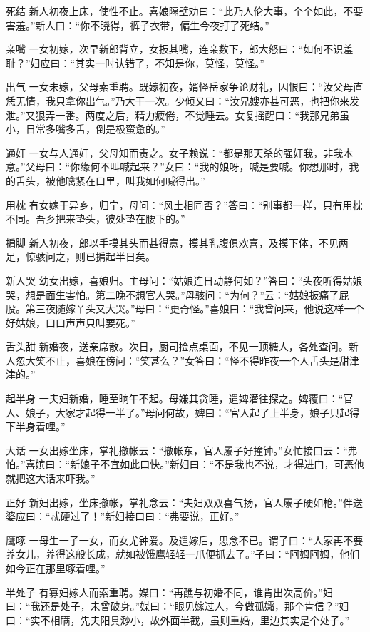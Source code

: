 \documentclass[12pt,UTF8]{ctexbook}
\begin{document}
死结
新人初夜上床，使性不止。喜娘隔壁劝曰：“此乃人伦大事，个个如此，不要害羞。”新人曰：“你不晓得，裤子衣带，偏生今夜打了死结。”

亲嘴
一女初嫁，次早新郎背立，女扳其嘴，连亲数下，郎大怒曰：“如何不识羞耻？”妇应曰：“其实一时认错了，不知是你，莫怪，莫怪。”

出气
一女未嫁，父母索重聘。既嫁初夜，婿怪岳家争论财礼，因恨曰：“汝父母直恁无情，我只拿你出气。”乃大干一次。少倾又曰：“汝兄嫂亦甚可恶，也把你来发泄。”又狠弄一番。两度之后，精力疲倦，不觉睡去。女复摇醒曰：“我那兄弟虽小，日常多嘴多舌，倒是极蛮惫的。”

通奸
一女与人通奸，父母知而责之。女子赖说：“都是那天杀的强奸我，非我本意。”父母曰：“你缘何不叫喊起来？”女曰：“我的娘呀，喊是要喊。你想那时，我的舌头，被他噙紧在口里，叫我如何喊得出。”

用枕
有女嫁于异乡，归宁，母问：“风土相同否？”答曰：“别事都一样，只有用枕不同。吾乡把来垫头，彼处垫在腰下的。”

掮脚
新人初夜，郎以手摸其头而甚得意，摸其乳腹俱欢喜，及摸下体，不见两足，惊骇问之，则已掮起半日矣。

新人哭
幼女出嫁，喜娘归。主母问：“姑娘连日动静何如？”答曰：“头夜听得姑娘哭，想是面生害怕。第二晚不想官人哭。”母骇问：“为何？”云：“姑娘扳痛了屁股。第三夜随嫁丫头又大哭。”母曰：“更奇怪。”喜娘曰：“我曾问来，他说这样一个好姑娘，口口声声只叫要死。”

舌头甜
新婚夜，送亲席散。次日，厨司捡点桌面，不见一顶糖人，各处查问。新人忽大笑不止，喜娘在傍问：“笑甚么？”女答曰：“怪不得昨夜一个人舌头是甜津津的。”

起半身
一夫妇新婚，睡至晌午不起。母嫌其贪睡，遣婢潜往探之。婢覆曰：“官人、娘子，大家才起得一半了。”母问何故，婢曰：“官人起了上半身，娘子只起得下半身着哩。”

大话
一女出嫁坐床，掌礼撤帐云：“撤帐东，官人屪子好撞钟。”女忙接口云：“弗怕。”喜嫔曰：“新娘子不宜如此口快。”新妇曰：“不是我也不说，才得进门，可恶他就把这大话来吓我。”

正好
新妇出嫁，坐床撤帐，掌礼念云：“夫妇双双喜气扬，官人屪子硬如枪。”伴送婆应曰：“忒硬过了！”新妇接口曰：“弗要说，正好。”

鹰啄
一母生一子一女，而女尤钟爱。及遣嫁后，思念不已。谓子曰：“人家再不要养女儿，养得这般长成，就如被饿鹰轻轻一爪便抓去了。”子曰：“阿姆阿姆，他们如今正在那里啄着哩。”

半处子
有寡妇嫁人而索重聘。媒曰：“再醮与初婚不同，谁肯出次高价。”妇曰：“我还是处子，未曾破身。”媒曰：“眼见嫁过人，今做孤孀，那个肯信？”妇曰：“实不相瞒，先夫阳具渺小，故外面半截，虽则重婚，里边其实是个处子。”
\end{document}
